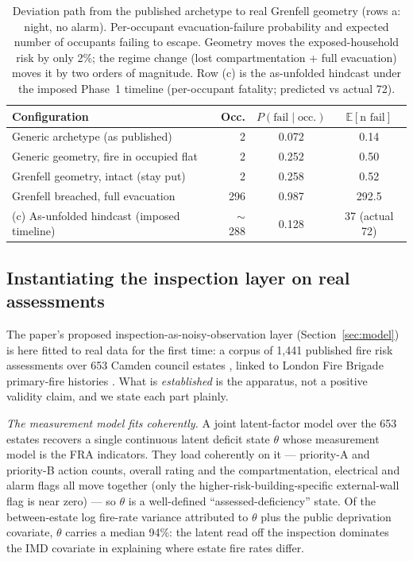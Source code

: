 \begin{table}[htbp]
  \centering
  \caption{Deviation path from the published archetype to real Grenfell geometry
  (rows a: night, no alarm). Per-occupant evacuation-failure probability and expected
  number of occupants failing to escape. Geometry moves the exposed-household risk by
  only 2\%; the regime change (lost compartmentation + full evacuation) moves it by
  two orders of magnitude. Row (c) is the as-unfolded hindcast under the imposed
  Phase~1 timeline (per-occupant fatality; predicted vs actual 72).}
  \label{tab:casestudy}
  \small
  \begin{tabular}{@{}lrcc@{}}
    \toprule
    Configuration & Occ. & $P(\text{fail}\mid\text{occ.})$ & $\mathbb{E}[\text{n fail}]$ \\
    \midrule
    Generic archetype (as published)          & 2   & 0.072 & 0.14 \\
    Generic geometry, fire in occupied flat    & 2   & 0.252 & 0.50 \\
    Grenfell geometry, intact (stay put)       & 2   & 0.258 & 0.52 \\
    Grenfell breached, full evacuation         & 296 & 0.987 & 292.5 \\
    \midrule
    (c) As-unfolded hindcast (imposed timeline) & $\sim$288 & 0.128 & 37 (actual 72) \\
    \bottomrule
  \end{tabular}
\end{table}

\subsection{Instantiating the inspection layer on real assessments}
\label{sec:results-latent}

The paper's proposed inspection-as-noisy-observation layer
(Section~\ref{sec:model}) is here fitted to real data for the first time: a corpus of
1{,}441 published fire risk assessments over 653 Camden council estates
\citep{camden_fra}, linked to London Fire Brigade primary-fire histories
\citep{lfb_incidents}. What is \emph{established} is the apparatus, not a positive
validity claim, and we state each part plainly.

\emph{The measurement model fits coherently.} A joint latent-factor model over the 653
estates recovers a single continuous latent deficit state $\theta$ whose measurement
model is the FRA indicators. They load coherently on it --- priority-A and priority-B
action counts, overall rating and the compartmentation, electrical and alarm flags all
move together (only the higher-risk-building-specific external-wall flag is near zero)
--- so $\theta$ is a well-defined ``assessed-deficiency'' state. Of the between-estate
log fire-rate variance attributed to $\theta$ plus the public deprivation covariate,
$\theta$ carries a median 94\%: the latent read off the inspection dominates the IMD
covariate in explaining where estate fire rates differ.

